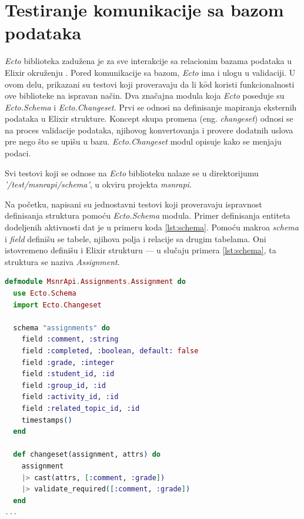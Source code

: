 \documentclass[12pt,oneside]{memoir}
\begin{document}
\section{Testiranje komunikacije sa bazom podataka}
\par \emph{Ecto} biblioteka zadužena je za sve interakcije sa relacionim bazama podataka u Elixir okruženju \cite{ecto}. Pored komunikacije sa bazom, \emph{Ecto} ima i ulogu u validaciji. U ovom delu, prikazani su testovi koji proveravaju da li k$\hat{o}$d koristi funkcionalnosti ove biblioteke na ispravan način. Dva značajna modula koja \emph{Ecto} poseduje su \emph{Ecto.Schema} i \emph{Ecto.Changeset}. Prvi se odnosi na definisanje mapiranja eksternih podataka u Elixir strukture. Koncept skupa promena (eng. \emph{changeset}) odnosi se na proces validacije podataka, njihovog konvertovanja i provere dodatnih uslova pre nego što se upišu u bazu. \emph{Ecto.Changeset} modul opisuje kako se menjaju podaci. 
\par Svi testovi koji se odnose na \emph{Ecto} biblioteku nalaze se u direktorijumu \textit{'/test/msnr{\textunderscore}api/schema'}, u okviru projekta \emph{msnr{\textunderscore}api}. 
\par Na početku, napisani su jednostavni testovi koji proveravaju ispravnost definisanja struktura pomoću \emph{Ecto.Schema} modula. Primer definisanja entiteta dodeljenih aktivnosti  dat je u primeru koda \ref{lst:schema}. Pomoću makroa \emph{schema} i \emph{field} definišu se tabele, njihova polja i relacije sa drugim tabelama. Oni istovremeno definišu i Elixir strukturu --- u slučaju primera \ref{lst:schema}, ta struktura se naziva \emph{Assignment}. 

\begin{lstlisting}[language=elixir, caption={Shema tabele assignments},captionpos=b, label={lst:schema}]
defmodule MsnrApi.Assignments.Assignment do
  use Ecto.Schema
  import Ecto.Changeset

  schema "assignments" do
    field :comment, :string
    field :completed, :boolean, default: false
    field :grade, :integer
    field :student_id, :id
    field :group_id, :id
    field :activity_id, :id
    field :related_topic_id, :id
    timestamps()
  end

  def changeset(assignment, attrs) do
    assignment
    |> cast(attrs, [:comment, :grade])
    |> validate_required([:comment, :grade])
  end
...
\end{lstlisting}
\end{document}
